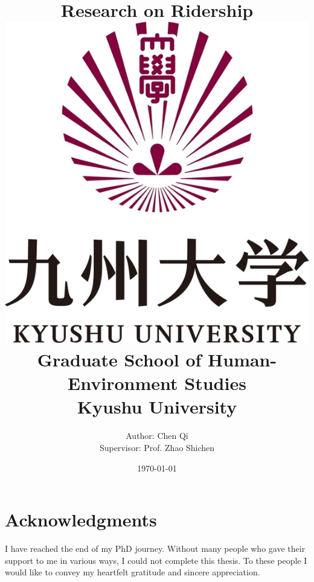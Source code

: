 \documentclass[12pt, twoside, a4paper]{book} %
\begin{document}
\title{
	{Research on Ridership}\\
	{\vspace{3cm}}
	{\includegraphics[scale=0.2]{university.jpg}}\\
	{\vspace{2cm}}
	{\large Graduate School of Human-Environment Studies}\\
	{\large Kyushu University}
}
\author{
	{Author: Chen Qi}\\
	{Supervisor: Prof. Zhao Shichen}
	{\vspace{1cm}}
}
\date{\today}
\maketitle

\tableofcontents %
\listoffigures %
\listoftables %

\frontmatter
\setlength{\parskip}{0.5\baselineskip} %
\chapter{Acknowledgments}
%
I have reached the end of my PhD journey. Without many people who gave their support to me in various ways, I could not complete this thesis. To these people I would like to convey my heartfelt gratitude and sincere appreciation. 
\end{document}
